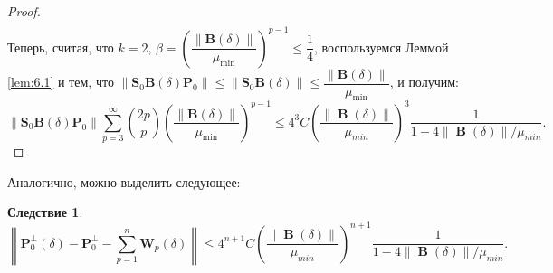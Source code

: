 \documentclass[specialist,
substylefile = spbu_report.rtx,
subf,href,colorlinks=true, 12pt]{disser}
\newcommand\norm[1]{\left\|#1\right\|}
\let\S\relax
\DeclareMathOperator\S{\mathbf{S}}
\DeclareMathOperator\B{\mathbf{B}}
\newtheorem{corollary}{Следствие}
\begin{document}
\begin{proof}
\begin{align*}
		\end{align*}
		Теперь, считая, что $k=2,\,\beta = \left(\dfrac{\norm{\mathbf{B}(\delta)}}{\mu_{\min}}\right)^{p-1} \leqslant\dfrac{1}{4}$, воспользуемся Леммой \ref{lem:6.1} и тем, что $\norm{\mathbf{S}_0\mathbf{B}(\delta)\mathbf{P}_0}\leqslant\norm{\mathbf{S}_0\mathbf{B}(\delta)}\leqslant\dfrac{\norm{\mathbf{B}(\delta)}}{\mu_{\min}}$, и получим:
		\begin{equation*}
			\norm{\mathbf{S}_0\mathbf{B}(\delta)\mathbf{P}_0}\sum_{p=3}^\infty{2p\choose p}\left(\dfrac{\norm{\mathbf{B}(\delta)}}{\mu_{\min}}\right)^{p-1}\leqslant4^3C\left(\dfrac{\norm{\B(\delta)}}{\mu_{min}}\right)^3\dfrac{1}{1-4\norm{\B(\delta)}/\mu_{min}}.
		\end{equation*}
	\end{proof}
	Аналогично, можно выделить следующее:
	\begin{corollary}%
		\begin{equation}\label{eq:m_2}
			\norm{\mathbf{P}_0^\bot(\delta) - \mathbf{P}_0^\bot - \sum\limits^n_{p=1}\mathbf{W}_p(\delta)} \leqslant 4^{n+1}C\left(\dfrac{\norm{\B(\delta)}}{\mu_{min}}\right)^{n+1}\dfrac{1}{1-4\norm{\B(\delta)}/\mu_{min}}.
		\end{equation}
	\end{corollary}
\end{document}
